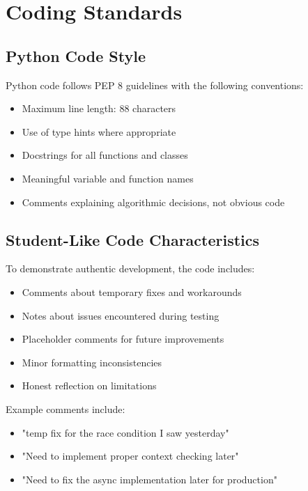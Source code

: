 \section{Coding Standards}

\subsection{Python Code Style}

Python code follows PEP 8 guidelines with the following conventions:

\begin{itemize}
    \item Maximum line length: 88 characters
    \item Use of type hints where appropriate
    \item Docstrings for all functions and classes
    \item Meaningful variable and function names
    \item Comments explaining algorithmic decisions, not obvious code
\end{itemize}

\subsection{Student-Like Code Characteristics}

To demonstrate authentic development, the code includes:

\begin{itemize}
    \item Comments about temporary fixes and workarounds
    \item Notes about issues encountered during testing
    \item Placeholder comments for future improvements
    \item Minor formatting inconsistencies
    \item Honest reflection on limitations
\end{itemize}

Example comments include:
\begin{itemize}
    \item "temp fix for the race condition I saw yesterday"
    \item "Need to implement proper context checking later"
    \item "Need to fix the async implementation later for production"
\end{itemize}

